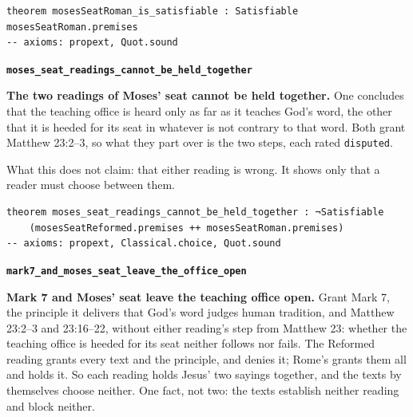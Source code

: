 \documentclass[11pt]{article}
\begin{document}
{\small\begin{verbatim}
theorem mosesSeatRoman_is_satisfiable : Satisfiable mosesSeatRoman.premises
-- axioms: propext, Quot.sound
\end{verbatim}}
\par\medskip\noindent\textbf{\texttt{moses\_\allowbreak{}seat\_\allowbreak{}readings\_\allowbreak{}cannot\_\allowbreak{}be\_\allowbreak{}held\_\allowbreak{}together}}\par\nobreak\noindent
\textbf{The two readings of Moses’ seat cannot be held together.} One concludes that the teaching office is heard only as far as it teaches God’s word, the other that it is heeded for its seat in whatever is not contrary to that word. Both grant Matthew 23:2–3, so what they part over is the two steps, each rated \texttt{disputed}.

What this does not claim: that either reading is wrong. It shows only that a reader must choose between them.

{\small\begin{verbatim}
theorem moses_seat_readings_cannot_be_held_together : ¬Satisfiable
    (mosesSeatReformed.premises ++ mosesSeatRoman.premises)
-- axioms: propext, Classical.choice, Quot.sound
\end{verbatim}}
\par\medskip\noindent\textbf{\texttt{mark7\_\allowbreak{}and\_\allowbreak{}moses\_\allowbreak{}seat\_\allowbreak{}leave\_\allowbreak{}the\_\allowbreak{}office\_\allowbreak{}open}}\par\nobreak\noindent
\textbf{Mark 7 and Moses’ seat leave the teaching office open.} Grant Mark 7, the principle it delivers that God’s word judges human tradition, and Matthew 23:2–3 and 23:16–22, without either reading’s step from Matthew 23: whether the teaching office is heeded for its seat neither follows nor fails. The Reformed reading grants every text and the principle, and denies it; Rome’s grants them all and holds it. So each reading holds Jesus’ two sayings together, and the texts by themselves choose neither. One fact, not two: the texts establish neither reading and block neither.
\end{document}
